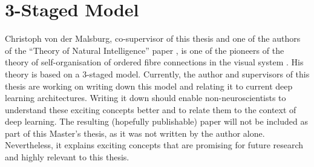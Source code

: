\section{3-Staged Model}
Christoph von der Malsburg, co-supervisor of this thesis and one of the authors of the ``Theory of Natural Intelligence'' paper , is one of the pioneers of the theory of self-organisation of ordered fibre connections in the visual system . His theory is based on a $3$-staged model. Currently, the author and supervisors of this thesis are working on writing down this model and relating it to current deep learning architectures. Writing it down should enable non-neuroscientists to understand these exciting concepts better and to relate them to the context of deep learning. The resulting (hopefully publishable) paper will not be included as part of this Master's thesis, as it was not written by the author alone. Nevertheless, it explains exciting concepts that are promising for future research and highly relevant to this thesis.

